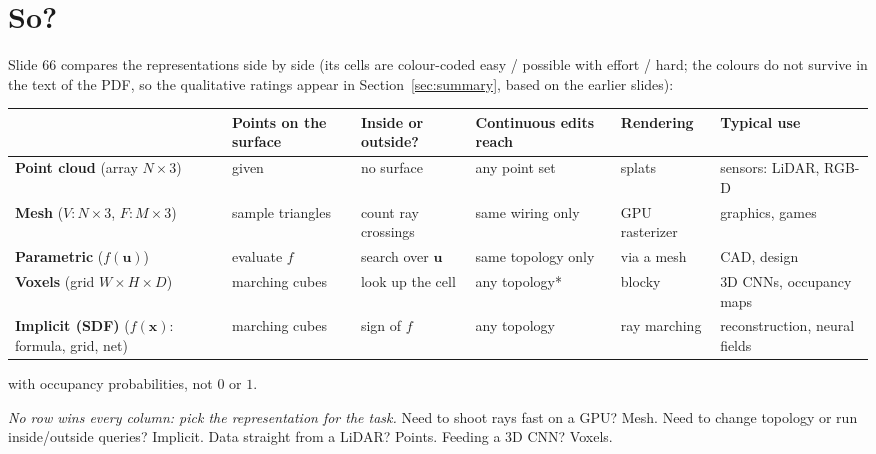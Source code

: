 \documentclass[11pt,a4paper]{article}
\newcommand{\vx}{\bm{x}}
\newcommand{\vu}{\bm{u}}
\theoremstyle{definition}
\theoremstyle{plain}
\theoremstyle{remark}
\begin{document}
\section{So? }
Slide 66 compares the representations side by side (its cells are colour-coded easy / possible with effort / hard; the colours do not survive in the text of the PDF, so the qualitative ratings appear in Section~\ref{sec:summary}, based on the earlier slides):

\begin{center}
\small
\renewcommand{\arraystretch}{1.25}
\setlength{\tabcolsep}{3pt}\begin{tabular}{L{2.2cm}L{2.4cm}L{2.3cm}L{2.4cm}L{2.1cm}L{2.5cm}}
\toprule
 & \textbf{Points on the surface} & \textbf{Inside or outside?} & \textbf{Continuous edits reach} & \textbf{Rendering} & \textbf{Typical use}\\
\midrule
\textbf{Point cloud} (array $N\times3$) & given & no surface & any point set & splats & sensors: LiDAR, RGB-D\\
\textbf{Mesh} ($V:N\times3$, $F:M\times3$) & sample triangles & count ray crossings & same wiring only & GPU rasterizer & graphics, games\\
\textbf{Parametric} ($f(\vu)$) & evaluate $f$ & search over $\vu$ & same topology only & via a mesh & CAD, design\\
\textbf{Voxels} (grid $W\times H\times D$) & marching cubes & look up the cell & any topology* & blocky & 3D CNNs, occupancy maps\\
\textbf{Implicit (SDF)} ($f(\vx)$: formula, grid, net) & marching cubes & sign of $f$ & any topology & ray marching & reconstruction, neural fields\\
\bottomrule
\end{tabular}
\end{center}
{\small * with occupancy probabilities, not $0$ or $1$.}

\begin{intuition}
\emph{No row wins every column: pick the representation for the task.} Need to shoot rays fast on a GPU? Mesh. Need to change topology or run inside/outside queries? Implicit. Data straight from a LiDAR? Points. Feeding a 3D CNN? Voxels.
\end{intuition}

\end{document}
